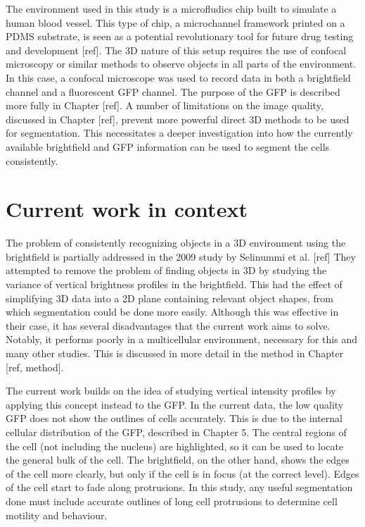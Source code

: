 The environment used in this study is a microfludics chip built to simulate a human blood vessel. This type of chip, a microchannel framework printed on a PDMS substrate, is seen as a potential revolutionary tool for future drug testing and development [ref]. The 3D nature of this setup requires the use of confocal microscopy or similar methods to observe objects in all parts of the environment. In this case, a confocal microscope was used to record data in both a brightfield channel and a fluorescent GFP channel. The purpose of the GFP is described more fully in Chapter [ref]. A number of limitations on the image quality, discussed in Chapter [ref], prevent more powerful direct 3D methods to be used for segmentation. This necessitates a deeper investigation into how the currently available brightfield and GFP information can be used to segment the cells consistently.

\section{Current work in context}

The problem of consistently recognizing objects in a 3D environment using the brightfield is partially addressed in the 2009 study by Selinummi et al. [ref] They attempted to remove the problem of finding objects in 3D by studying the variance of vertical brightness profiles in the brightfield. This had the effect of simplifying 3D data into a 2D plane containing relevant object shapes, from which segmentation could be done more easily. Although this was effective in their case, it has several disadvantages that the current work aims to solve. Notably, it performs poorly in a multicellular environment, necessary for this and many other studies. This is discussed in more detail in the method in Chapter [ref, method].

The current work builds on the idea of studying vertical intensity profiles by applying this concept instead to the GFP. In the current data, the low quality GFP does not show the outlines of cells accurately. This is due to the internal cellular distribution of the GFP, described in Chapter 5. The central regions of the cell (not including the nucleus) are highlighted, so it can be used to locate the general bulk of the cell. The brightfield, on the other hand, shows the edges of the cell more clearly, but only if the cell is in focus (at the correct level). Edges of the cell start to fade along protrusions. In this study, any useful segmentation done must include accurate outlines of long cell protrusions to determine cell motility and behaviour.

